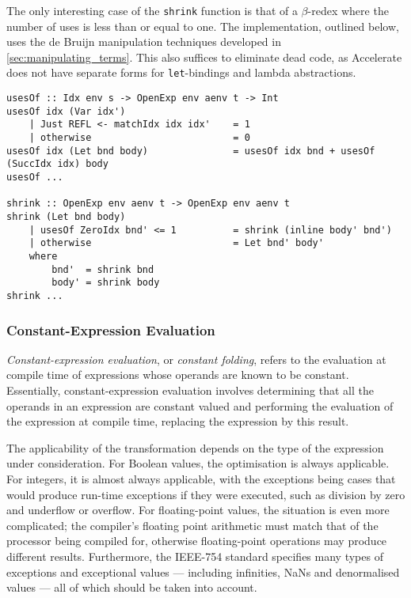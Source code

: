The only interesting case of the \texttt{shrink} function is that of a
$\beta$-redex where the number of uses is less than or equal to one. The
implementation, outlined below, uses the de Bruijn manipulation techniques
developed in \autoref{sec:manipulating_terms}. This also suffices to eliminate
dead code, as Accelerate does not have separate forms for \texttt{let}-bindings
and lambda abstractions.
%
\begin{lstlisting}[style=Haskell,caption={The shrinking reduction}]
usesOf :: Idx env s -> OpenExp env aenv t -> Int
usesOf idx (Var idx')
    | Just REFL <- matchIdx idx idx'    = 1
    | otherwise                         = 0
usesOf idx (Let bnd body)               = usesOf idx bnd + usesOf (SuccIdx idx) body
usesOf ...

shrink :: OpenExp env aenv t -> OpenExp env aenv t
shrink (Let bnd body)
    | usesOf ZeroIdx bnd' <= 1          = shrink (inline body' bnd')
    | otherwise                         = Let bnd' body'
    where
        bnd'  = shrink bnd
        body' = shrink body
shrink ...
\end{lstlisting}


\subsubsection{Constant-Expression Evaluation}

\emph{Constant-expression evaluation}, or \emph{constant folding}, refers to the
evaluation at compile time of expressions whose operands are known to be
constant. Essentially, constant-expression evaluation involves determining that
all the operands in an expression are constant valued and performing the
evaluation of the expression at compile time, replacing the expression by this
result.

The applicability of the transformation depends on the type of the expression
under consideration. For Boolean values, the optimisation is always applicable.
For integers, it is almost always applicable, with the exceptions being cases
that would produce run-time exceptions if they were executed, such as division
by zero and underflow or overflow. For floating-point values, the situation is
even more complicated; the compiler's floating point arithmetic must match that
of the processor being compiled for, otherwise floating-point operations may
produce different results. Furthermore, the IEEE-754 standard specifies many
types of exceptions and exceptional values --- including infinities, NaNs and
denormalised values --- all of which should be taken into account.



